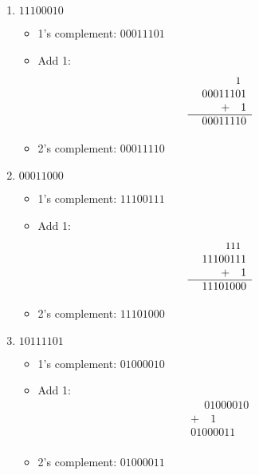 \documentclass{article}
\begin{document}
\begin{enumerate}
    \item \(11100010\)
        \begin{itemize}
            \item 1’s complement: \(00011101\)
            \item Add 1:
                  \[
                  \begin{array}{r}
                    \quad \text{\small 1} \phantom{0}\\
                    \phantom{+}00011101 \\
                    +\quad 1 \\
                    \hline
                    00011110 \\
                  \end{array}
                  \]
            \item 2’s complement: \(00011110\)
        \end{itemize}

    \item \(00011000\)
        \begin{itemize}
            \item 1’s complement: \(11100111\)
            \item Add 1:
                  \[
                  \begin{array}{r}
                    \quad \text{\small 111}\phantom{0} \\
                    \phantom{+}11100111 \\
                    +\quad 1 \\
                    \hline
                    11101000 \\
                  \end{array}
                  \]
            \item 2’s complement: \(11101000\)
        \end{itemize}

    \item \(10111101\)
        \begin{itemize}
            \item 1’s complement: \(01000010\)
            \item Add 1:
                  \[
                  \begin{array}{r}
                    \phantom{+}01000010 \\
                    +\quad 1 \\
                    \hline
                    01000011 \\
                  \end{array}
                  \]
            \item 2’s complement: \(01000011\)
        \end{itemize}


\end{enumerate}
\end{document}
